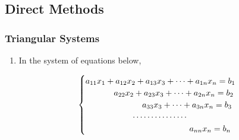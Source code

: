 \documentclass[10pt,compress]{beamer}
\begin{document}
\subsection{Direct Methods}
\begin{frame}
  \frametitle{Triangular Systems} 
  \begin{enumerate}
    \item <1-> In the system of equations below,
       {
         \begin{displaymath}
            \begin{cases}
              a_{11}x_{1}  + a_{12} x_{2} + a_{13} x_{3} + \cdots + a_{1n} x_{n} = b_{1} \\
           \hspace{1.2cm}   a_{22} x_{2} + a_{23} x_{3} + \cdots + a_{2n} x_{n} = b_{2} \\
           \hspace{2.4cm}                 a_{33} x_{3} + \cdots + a_{3n} x_{n} = b_{3} \\
           \hspace{2cm}       \cdots \cdots \cdots \cdots \cdots \\
           \hspace{4.4cm}                                        a_{nn} x_{n} = b_{n}         
            \end{cases}
         \end{displaymath}

}
\end{enumerate}
\end{frame}
\end{document}
